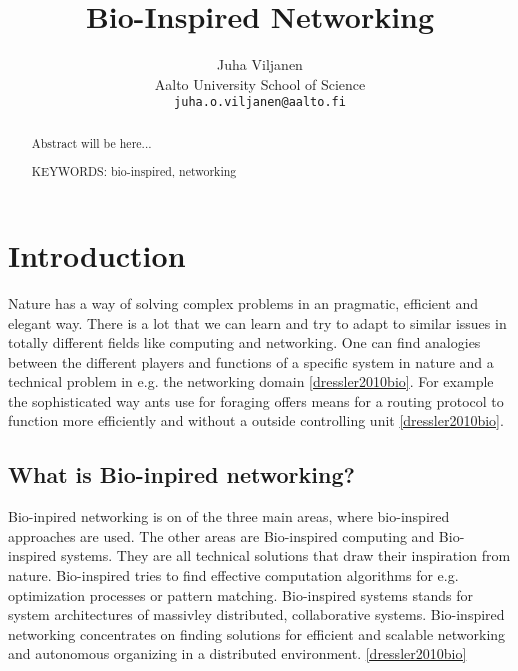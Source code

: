 \documentclass{IWORK2014}
\begin{document}

\title{Bio-Inspired Networking}

\author{Juha Viljanen\\
        Aalto University School of Science \\
	\texttt{juha.o.viljanen@aalto.fi}}
\maketitle


\begin{abstract}
  Abstract will be here...

\vspace{3mm}
\noindent KEYWORDS: bio-inspired, networking

\end{abstract}



\section{Introduction}

Nature has a way of solving complex problems in an pragmatic, efficient and elegant way. There is a lot that we can learn and try to adapt to similar issues in totally different fields like computing and networking. One can find analogies between the different players and functions of a specific system in nature and a technical problem in e.g. the networking domain \ref{dressler2010bio}. For example the sophisticated way ants use for foraging offers means for a routing protocol to function more efficiently and without a outside controlling unit \ref{dressler2010bio}.

\subsection{What is Bio-inpired networking?}
Bio-inpired networking is on of the three main areas, where bio-inspired approaches are used. The other areas are Bio-inspired computing and Bio-inspired systems. They are all technical solutions that draw their inspiration from nature. Bio-inspired tries to find effective computation algorithms for e.g. optimization processes or pattern matching. Bio-inspired systems stands for system architectures of massivley distributed, collaborative systems. Bio-inspired networking concentrates on finding solutions for efficient and scalable networking and autonomous organizing in a distributed environment. \ref{dressler2010bio}
\end{document}
